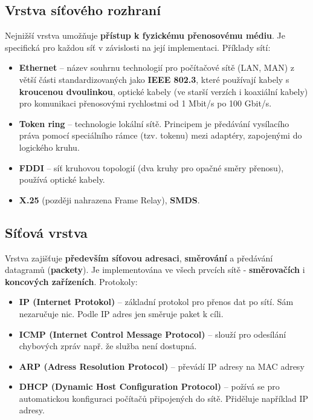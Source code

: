 \subsection{Vrstva síťového rozhraní}
Nejnižší vrstva umožňuje \textbf{přístup k fyzickému přenosovému médiu}. Je specifická pro každou síť v závislosti na její implementaci. Příklady sítí: 
\begin{itemize}
\item \textbf{Ethernet} --  název souhrnu technologií pro počítačové sítě (LAN, MAN) z větší části standardizovaných jako \textbf{IEEE 802.3}, které používají kabely s \textbf{kroucenou dvoulinkou}, optické kabely (ve starší verzích i koaxiální kabely) pro komunikaci přenosovými rychlostmi od 1 Mbit/s po 100 Gbit/s.
\item \textbf{Token ring} -- technologie lokální sítě. Principem je předávání vysílacího práva pomocí speciálního rámce (tzv. tokenu) mezi adaptéry, zapojenými do logického kruhu.
\item \textbf{FDDI} -- síť kruhovou topologií (dva kruhy pro opačné směry přenosu), používá optické kabely.
\item \textbf{X.25} (později nahrazena Frame Relay), \textbf{SMDS}.
\end{itemize}


\subsection{Síťová vrstva}
Vrstva zajišťuje \textbf{především síťovou adresaci}, \textbf{směrování} a předávání datagramů (\textbf{packety}). Je implementována ve všech prvcích sítě - \textbf{směrovačích} i \textbf{koncových zařízeních}. Protokoly:
\begin{itemize}
\item \textbf{IP (Internet Protokol)} -- základní protokol pro přenos dat po sítí. Sám nezaručuje nic. Podle IP adres jen směruje paket k cíli.
\item \textbf{ICMP (Internet Control Message Protocol)} -- slouží pro odesílání chybových zpráv např. že služba není dostupná.
\item \textbf{ARP (Adress Resolution Protocol)} -- převádí IP adresy na MAC adresy
\item \textbf{DHCP (Dynamic Host Configuration Protocol)} -- požívá se pro automatickou konfiguraci počítačů připojených do sítě. Přiděluje například IP adresy.
\end{itemize}

